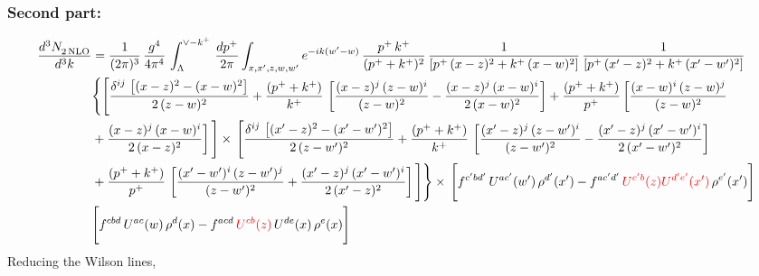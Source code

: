 \documentclass[9pt]{article}
\numberwithin{equation}{section}
\begin{document}
\subsubsection{Second part:\,}
\begin{align}
    \frac{d^{3}N_{2\,\rm NLO}^{\rm}}{d^{3}k}  & = \frac{1}{(2\pi)^{3}}\, \frac{g^{4}}{4\pi^{4}}\,\int_{\Lambda}^{\vee-k^{+}}\, \frac{dp^{+}}{2\pi}\int_{x,x',z,w,w^{\prime}} e^{-ik(w^{\prime}-w)}\,\frac{p^{+}\,k^{+}}{(p^{+}+k^{+})^{2}}\, \frac{1}{\left[p^{+}\,(x-z)^{2}+k^{+}\,(x-w)^{2}\right]}\,\frac{1}{\left[p^{+}\,(x'-z)^{2}+k^{+}\,(x'-w')^{2}\right]}\notag \\ & \Bigg\{\Bigg[\frac{\delta^{ij}\, \left[(x-z)^{2}-(x-w)^{2}\right]}{2\,(z-w)^{2}} + \frac{(p^{+}+k^{+})}{k^{+}}\, \left[\frac{(x-z)^{j}\,(z-w)^{i}}{(z-w)^{2}}-\frac{(x-z)^{j}\,(x-w)^{i}}{2\,(x-w)^{2}}\right]+\frac{(p^{+}+k^{+})}{p^{+}}\,\bigg[\frac{(x-w)^{i}\,(z-w)^{j}}{(z-w)^{2}}\notag \\ & +\frac{(x-z)^{j}\,(x-w)^{i}}{2\,(x-z)^{2}}\bigg]\,\Bigg]\times\, \Bigg[\frac{\delta^{ij}\, \left[(x'-z)^{2}-(x'-w')^{2}\right]}{2\,(z-w')^{2}}+ \frac{(p^{+}+k^{+})}{k^{+}}\, \left[\frac{(x'-z)^{j}\,(z-w')^{i}}{(z-w')^{2}}-\frac{(x'-z)^{j}\,(x'-w')^{i}}{2\,(x'-w')^{2}}\right]\notag \\ & +\frac{(p^{+}+k^{+})}{p^{+}}\,\left[\frac{(x'-w')^{i}\,(z-w')^{j}}{(z-w')^{2}} +\frac{(x'-z)^{j}\,(x'-w')^{i}}{2\,(x'-z)^{2}}\right] \Bigg] \Bigg\} \times\, \Bigg[f^{c'bd'}\, U^{ac'}(w')\,\rho^{d'}(x')-f^{ac'd'}\, {\color{red}U^{c'b}(z)U^{d'e'}(x')}\, \rho^{e'}(x')\Bigg]\notag \\ & \Bigg[f^{cbd}\, U^{ac}(w)\,\rho^{d}(x) - f^{acd}\, {\color{red}U^{cb}(z)}\,U^{de}(x)\, \rho^{e}(x)\Bigg]
\end{align}
Reducing the Wilson lines, 
\end{document}
